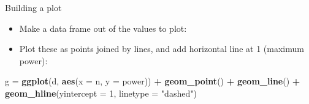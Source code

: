 \documentclass[ignorenonframetext,]{beamer}
\newenvironment{Shaded}{\begin{snugshade}}{\end{snugshade}}
\newcommand{\DataTypeTok}[1]{\textcolor[rgb]{0.13,0.29,0.53}{#1}}
\newcommand{\DecValTok}[1]{\textcolor[rgb]{0.00,0.00,0.81}{#1}}
\newcommand{\KeywordTok}[1]{\textcolor[rgb]{0.13,0.29,0.53}{\textbf{#1}}}
\newcommand{\NormalTok}[1]{#1}
\newcommand{\OperatorTok}[1]{\textcolor[rgb]{0.81,0.36,0.00}{\textbf{#1}}}
\newcommand{\StringTok}[1]{\textcolor[rgb]{0.31,0.60,0.02}{#1}}
\providecommand{\tightlist}{%
  \setlength{\itemsep}{0pt}\setlength{\parskip}{0pt}}
\begin{document}
\begin{frame}[fragile]{Building a plot}
\protect\hypertarget{building-a-plot}{}

\begin{itemize}
\tightlist
\item
  Make a data frame out of the values to plot:
\end{itemize}

\begin{Shaded}
\end{Shaded}

\begin{itemize}
\tightlist
\item
  Plot these as points joined by lines, and add horizontal line at 1
  (maximum power):
\end{itemize}

\begin{Shaded}
\begin{Highlighting}[]
\NormalTok{g =}\StringTok{ }\KeywordTok{ggplot}\NormalTok{(d, }\KeywordTok{aes}\NormalTok{(}\DataTypeTok{x =}\NormalTok{ n, }\DataTypeTok{y =}\NormalTok{ power)) }\OperatorTok{+}\StringTok{ }\KeywordTok{geom_point}\NormalTok{() }\OperatorTok{+}\StringTok{ }
\StringTok{  }\KeywordTok{geom_line}\NormalTok{() }\OperatorTok{+}\StringTok{ }
\StringTok{  }\KeywordTok{geom_hline}\NormalTok{(}\DataTypeTok{yintercept =} \DecValTok{1}\NormalTok{, }\DataTypeTok{linetype =} \StringTok{"dashed"}\NormalTok{)}
\end{Highlighting}
\end{Shaded}

\end{frame}
\end{document}
